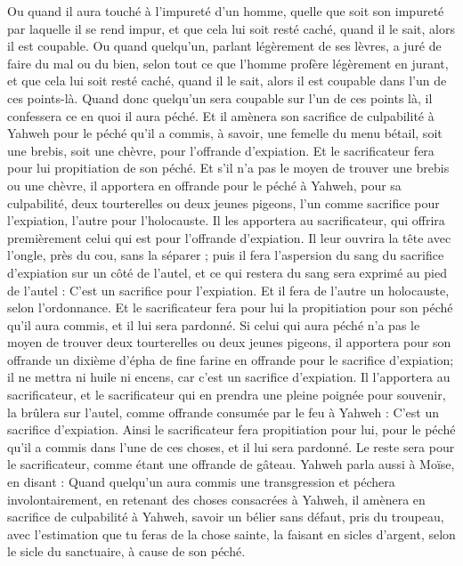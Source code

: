 \begin{multicols}{2}
Ou quand il aura touché à l'impureté d'un homme, quelle que soit son impureté par laquelle il se rend impur, et que cela lui soit resté caché, quand il le sait, alors il est coupable.
Ou quand quelqu'un, parlant légèrement de ses lèvres, a juré de faire du mal ou du bien, selon tout ce que l'homme profère légèrement en jurant, et que cela lui soit resté caché, quand il le sait, alors il est coupable dans l'un de ces points-là.
Quand donc quelqu'un sera coupable sur l'un de ces points là, il confessera ce en quoi il aura péché.
Et il amènera son sacrifice de culpabilité à Yahweh pour le péché qu'il a commis, à savoir, une femelle du menu bétail, soit une brebis, soit une chèvre, pour l'offrande d'expiation. Et le sacrificateur fera pour lui propitiation de son péché.
Et s'il n'a pas le moyen de trouver une brebis ou une chèvre, il apportera en offrande pour le péché à Yahweh, pour sa culpabilité, deux tourterelles ou deux jeunes pigeons, l'un comme sacrifice pour l'expiation, l'autre pour l'holocauste.
Il les apportera au sacrificateur, qui offrira premièrement celui qui est pour l'offrande d'expiation. Il leur ouvrira la tête avec l'ongle, près du cou, sans la séparer ;
puis il fera l'aspersion du sang du sacrifice d'expiation sur un côté de l'autel, et ce qui restera du sang sera exprimé au pied de l'autel : C'est un sacrifice pour l'expiation.
Et il fera de l'autre un holocauste, selon l'ordonnance. Et le sacrificateur fera pour lui la propitiation pour son péché qu'il aura commis, et il lui sera pardonné.
Si celui qui aura péché n'a pas le moyen de trouver deux tourterelles ou deux jeunes pigeons, il apportera pour son offrande un dixième d'épha de fine farine en offrande pour le sacrifice d'expiation; il ne mettra ni huile ni encens, car c'est un sacrifice d'expiation.
Il l'apportera au sacrificateur, et le sacrificateur qui en prendra une pleine poignée pour souvenir, la brûlera sur l'autel, comme offrande consumée par le feu à Yahweh : C'est un sacrifice d'expiation.
Ainsi le sacrificateur fera propitiation pour lui, pour le péché qu'il a commis dans l'une de ces choses, et il lui sera pardonné. Le reste sera pour le sacrificateur, comme étant une offrande de gâteau.
Yahweh parla aussi à Moïse, en disant :
Quand quelqu'un aura commis une transgression et péchera involontairement, en retenant des choses consacrées à Yahweh, il amènera en sacrifice de culpabilité à Yahweh, savoir un bélier sans défaut, pris du troupeau, avec l'estimation que tu feras de la chose sainte, la faisant en sicles d'argent, selon le sicle du sanctuaire, à cause de son péché.

\end{multicols}
